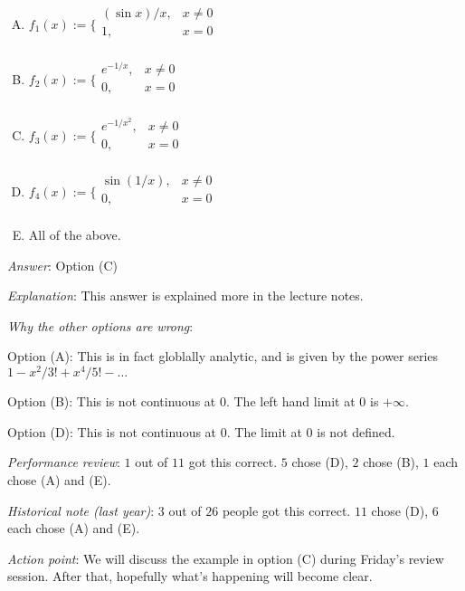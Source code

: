 \documentclass[10pt]{amsart}
\begin{document}
\begin{enumerate}
  \begin{enumerate}[(A)]
  \item $f_1(x) := \lbrace \begin{array}{rl} (\sin x)/x, & x \ne 0\\ 1, & x = 0 \\\end{array}$
  \item $f_2(x) := \lbrace \begin{array}{rl} e^{-1/x}, & x \ne 0\\ 0, & x = 0 \\\end{array}$
  \item $f_3(x) := \lbrace \begin{array}{rl} e^{-1/x^2}, & x \ne 0\\ 0, & x = 0 \\\end{array}$
  \item $f_4(x) := \lbrace \begin{array}{rl} \sin(1/x), & x \ne 0 \\ 0, & x = 0 \\\end{array}$
  \item All of the above.
  \end{enumerate}

  {\em Answer}: Option (C)

  {\em Explanation}: This answer is explained more in the lecture
  notes.

  {\em Why the other options are wrong}:

  Option (A): This is in fact globlally analytic, and is given by the
  power series $1 - x^2/3! + x^4/5! - \dots$

  Option (B): This is not continuous at $0$. The left hand limit at
  $0$ is $+\infty$.

  Option (D): This is not continuous at $0$. The limit at $0$ is not
  defined.

  {\em Performance review}: $1$ out of $11$ got this correct. $5$
  chose (D), $2$ chose (B), $1$ each chose (A) and (E).

  {\em Historical note (last year)}: $3$ out of $26$ people got this
  correct. $11$ chose (D), $6$ each chose (A) and (E).

  {\em Action point}: We will discuss the example in option (C) during
  Friday's review session. After that, hopefully what's happening will
  become clear.


\end{enumerate}
\end{document}
